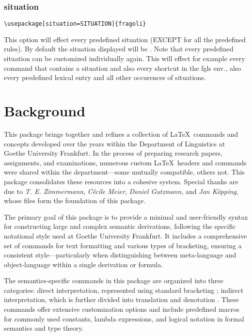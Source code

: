 \documentclass[10pt, a4paper]{article}
\begin{document}
	\subsubsection{situation}
	\begin{lstlisting}[style=A]
	\usepackage[situation=SITUATION]{fragoli}
	\end{lstlisting}
	This option will effect every predefined situation (EXCEPT for all the predefined rules). By default the situation displayed will be \sstar. Note that every predefined situation can be customized individually again. This will effect for example every command that contains a situation and also every shortcut in the fgls env., also every predefined lexical entry and all other occurences of situations.
	\section{Background}
	This package brings together and refines a collection of \LaTeX\ commands and concepts developed over the years within the Department of Linguistics at Goethe University Frankfurt. In the process of preparing research papers, assignments, and examinations, numerous custom \LaTeX\ headers and commands were shared within the department—some mutually compatible, others not. This package consolidates these resources into a cohesive system. Special thanks are due to \textit{T. E. Zimmermann}, \textit{Cécile Meier}, \textit{Daniel Gutzmann}, and \textit{Jan Köpping}, whose files form the foundation of this package.
	
	The primary goal of this package is to provide a minimal and user-friendly syntax for constructing large and complex semantic derivations, following the specific notational style used at Goethe University Frankfurt. It includes a comprehensive set of commands for text formatting and various types of bracketing, ensuring a consistent style—particularly when distinguishing between meta-language and object-language within a single derivation or formula.
	
	The semantics-specific commands in this package are organized into three categories: direct interpretation, represented using standard bracketing ; indirect interpretation, which is further divided into translation  and denotation . These commands offer extensive customization options and include predefined macros for commonly used constants, lambda expressions, and logical notation in formal semantics and type theory.
	
\end{document}
